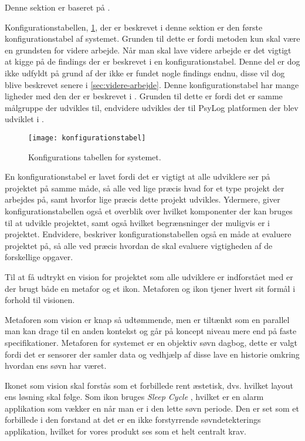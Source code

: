 Denne sektion er baseret på \citet{art:essence}.

Konfigurationstabellen, \cref{tab:konfigurationsTabel}, der er beskrevet i denne sektion er den første konfigurationstabel af systemet.
Grunden til dette er fordi metoden kun skal være en grundsten for videre arbejde.
Når man skal lave videre arbejde er det vigtigt at kigge på de findings der er beskrevet i en konfigurationstabel.
Denne del er dog ikke udfyldt på grund af der ikke er fundet nogle findings endnu, disse vil dog blive beskrevet senere i \cref{sec:videre-arbejde}.
Denne konfigurationstabel har mange ligheder med den der er beskrevet i \citet{misc:faellesrapp}.
Grunden til dette er fordi det er samme målgruppe der udvikles til, endvidere udvikles der til PsyLog platformen der blev udviklet i \citet{misc:faellesrapp}.

\begin{figure}[]\centering
	\texttt{[image: konfigurationstabel]}
	\caption{Konfigurations tabellen for systemet.}
	\label{tab:konfigurationsTabel}
\end{figure}

En konfigurationstabel er lavet fordi det er vigtigt at alle udviklere ser på projektet på samme måde, så alle ved lige præcis hvad for et type projekt der arbejdes på, samt hvorfor lige præcis dette projekt udvikles.
Ydermere, giver konfigurationstabellen også et overblik over hvilket komponenter der kan bruges til at udvikle projektet, samt også hvilket begrænsninger der muligvis er i projektet.
Endvidere, beskriver konfigurationstabellen også en måde at evaluere projektet på, så alle ved præcis hvordan de skal evaluere vigtigheden af de forskellige opgaver.

Til at få udtrykt en vision for projektet som alle udviklere er indforstået med er der brugt både en metafor og et ikon.
Metaforen og ikon tjener hvert sit formål i forhold til visionen.

Metaforen som vision er knap så udtømmende, men er tiltænkt som en parallel man kan drage til en anden kontekst og går på koncept niveau mere end på faste specifikationer.
Metaforen for systemet er en objektiv søvn dagbog, dette er valgt fordi det er sensorer der samler data og vedhjælp af disse lave en historie omkring hvordan ens søvn har været.

Ikonet som vision skal forstås som et forbillede rent æstetisk, dvs. hvilket layout ens løsning skal følge.
Som ikon bruges \textit{Sleep Cycle} \citep{misc:sleepCycle}, hvilket er en alarm applikation som vækker en når man er i den lette søvn periode.
Den er set som et forbillede i den forstand at det er en ikke forstyrrende søvndetekterings applikation, hvilket for vores produkt ses som et helt centralt krav.